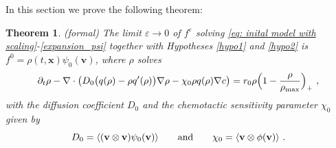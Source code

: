 \documentclass{aims} %
\newtheorem{theorem}{Theorem}[section]
\theoremstyle{definition}
\begin{document}
In this section we prove the following theorem:
\begin{theorem}{}\label{theorem1}(formal)
The limit $\varepsilon \rightarrow 0$ of $f^\varepsilon$ solving \eqref{eq: inital model with scaling}-\eqref{expansion_psi} together with Hypotheses \ref{hypo1} and \ref{hypo2} is $f^0 = \rho(t,\mathbf{x})\psi_0(\mathbf{v})$, where $\rho$ solves
\begin{equation}
    \partial_t\rho-\nabla\cdot\left(D_0\big(q(\rho)-\rho q'(\rho) \big)\nabla \rho-\chi_0\rho q(\rho)\nabla c \right)={r_0\rho\Bigl(1-\frac{\rho}{\rho_{\textnormal{max}}} \Bigr)_+}\ ,\label{eq: macroscopic equation1}
\end{equation}
with the diffusion coefficient $D_0$ and the chemotactic sensitivity parameter $\chi_0$ given by
\begin{equation}D_0=\langle(\mathbf{v}\otimes \mathbf{v})\psi_0(\mathbf{v})\rangle\qquad \textnormal{and}\qquad \chi_0=\langle\mathbf{v}\otimes\phi(\mathbf{v})\rangle\ . \label{eq: macroscopic coefficients}
\end{equation}
\end{theorem}
\end{document}
